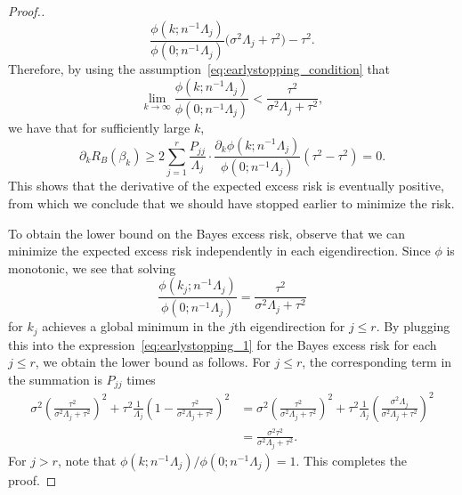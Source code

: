 \documentclass[11pt]{article}
\begin{document}
\begin{proof}[Proof.]
\[
    \frac{\phi(k;n^{-1}\Lambda_j)}{\phi(0; n^{-1}\Lambda_j)} \Big(\sigma^2 \Lambda_j + \tau^2\Big) - \tau^2.
\]
Therefore, by using the assumption~\eqref{eq:earlystopping_condition} that 
\[
    \lim_{k \to \infty} \frac{\phi(k;n^{-1}\Lambda_j)}{\phi(0; n^{-1}\Lambda_j)} < \frac{\tau^2}{\sigma^2\Lambda_j + \tau^2},
\]
we have that for sufficiently large $k$,
\[
    \partial_k R_B(\beta_k) \ge 2 \sum_{j=1}^{r} \frac{P_{jj}}{\Lambda_j} \cdot \frac{\partial_k \phi(k; n^{-1} \Lambda_j)}{\phi(0; n^{-1} \Lambda_j)} (\tau^2 - \tau^2) = 0.
\]
This shows that the derivative of the expected excess risk is eventually positive, from which we conclude that we should have stopped earlier to minimize the risk.

To obtain the lower bound on the Bayes excess risk, observe that we can minimize the expected excess risk independently in each eigendirection. Since $\phi$ is monotonic, we see that solving 
\[
   \frac{\phi(k_j;n^{-1}\Lambda_j)}{\phi(0; n^{-1}\Lambda_j)} = \frac{\tau^2}{\sigma^2\Lambda_j + \tau^2}
\]
for $k_j$ achieves a global minimum in the $j$th eigendirection for $j \le r$. By plugging this into the expression~\eqref{eq:earlystopping_1} for the Bayes excess risk for each $j \le r$, we obtain the lower bound as follows. For $j \le r$, the corresponding term in the summation is $P_{jj}$ times 
\begin{align*}
    \sigma^2 \left(\frac{\tau^2}{\sigma^2\Lambda_j + \tau^2}\right)^2 + \tau^2\frac{1}{\Lambda_j}\left(1-\frac{\tau^2}{\sigma^2\Lambda_j + \tau^2}\right)^2
    &= \sigma^2 \left(\frac{\tau^2}{\sigma^2\Lambda_j + \tau^2}\right)^2 + \tau^2\frac{1}{\Lambda_j}\left(\frac{\sigma^2\Lambda_j}{\sigma^2\Lambda_j + \tau^2}\right)^2 \\
    &= \frac{\sigma^2 \tau^2}{\sigma^2\Lambda_j + \tau^2}.
\end{align*}
For $j > r$, note that $\phi(k;n^{-1}\Lambda_j) / \phi(0; n^{-1}\Lambda_j) = 1$. This completes the proof.
\end{proof}
\end{document}
